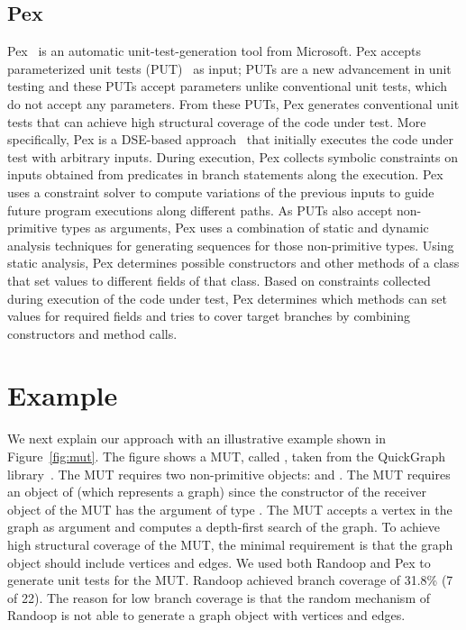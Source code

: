 \documentclass{sig-alternate}
\begin{document}
\subsection{Pex}
\label{sec:pex}
Pex~\cite{tillman:pexwhite} is an automatic unit-test-generation tool from Microsoft. Pex accepts parameterized unit tests (PUT)~\cite{tillmann05:parameterized} as input; PUTs are a new advancement in unit testing and these PUTs accept parameters unlike conventional unit tests, which do not accept any parameters. From these PUTs, Pex generates conventional unit tests that can achieve high structural coverage of the code under test. More specifically, Pex is a DSE-based approach~\cite{godefroid:dart} that initially executes the code under test with arbitrary inputs. During execution, Pex collects symbolic constraints on inputs obtained from predicates in branch statements along the execution. Pex uses a constraint solver to compute variations of the previous inputs to guide future program executions along different paths. As PUTs also accept non-primitive types as arguments, Pex uses a combination of static and dynamic analysis techniques for generating sequences for those non-primitive types. Using static analysis, Pex determines possible constructors and other methods of a class that set values to different fields of that class. Based on constraints collected during execution of the code under test, Pex determines which methods can set values for required fields and tries to cover target branches by combining constructors and method calls.

\section{Example}
\label{sec:example}

We next explain our approach with an illustrative example shown in Figure~\ref{fig:mut}. The figure shows a MUT, called , taken from the QuickGraph library~\cite{QUICKGRAPH}. The MUT requires two non-primitive objects:  and . The MUT requires an object of  (which represents a graph) since the constructor of the receiver object of the MUT has the argument of type . The MUT accepts a vertex in the graph as argument and computes a depth-first search of the graph. To achieve high structural coverage of the MUT, the minimal requirement is that the graph object should include vertices and edges. We used both Randoop and Pex to generate unit tests for the MUT. Randoop achieved branch coverage of 31.8\% (7 of 22). The reason for low branch coverage is that the random mechanism of Randoop is not able to generate a graph object with vertices and edges. 
\end{document}
